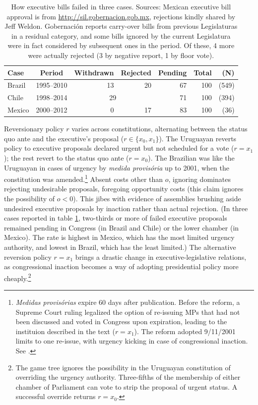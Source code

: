 \documentclass[letter,12pt]{article}
\newcommand{\mc}{\multicolumn}
\begin{document}
\begin{table}
\centering
\begin{tabular}{lcrrrrr}
Case   & Period     & Withdrawn & Rejected & Pending & Total & (N) \\ \hline
Brazil & 1995--2010 &  13       &   20     &   67    &  100  & (549) \\
Chile  & 1998--2014 & \mc{2}{c}{29}        &   71    &  100  & (394) \\
Mexico & 2000--2012 &   0       &   17     &   83    &  100  &  (36) \\
\end{tabular}
\caption{How executive bills failed in three cases. Sources: Mexican executive bill approval is from \protect\url{http://sil.gobernacion.gob.mx}, rejections kindly shared by Jeff Weldon. Gobernaci\'on reports carry-over bills from previous Legislaturas in a residual category, and some bills ignored by the current Legislatura were in fact considered by subsequent ones in the period. Of these, 4 more were actually rejected (3 by negative report, 1 by floor vote).}\label{t:exBillFail}
\end{table}

Reversionary policy $r$ varies across constitutions, alternating between the status quo ante and the executive's proposal ($r\in\{x_0,x_1\}$). The Uruguayan reverts policy to executive proposals declared urgent but not scheduled for a vote ($r=x_1$); the rest revert to the status quo ante ($r=x_0$). The Brazilian was like the Uruguayan in cases of urgency by \emph{medida provis\'oria} up to 2001, when the constitution was amended.\footnote{\emph{Medidas provis\'orias} expire 60 days after publication. Before the reform, a Supreme Court ruling legalized the option of re-issuing MPs that had not been discussed and voted in Congress upon expiration, leading to the instituion described in the text ($r=x_1$). The reform adopted 9/11/2001 limits to one re-issue, with urgency kicking in case of congressional inaction. See \citet{figueiredo.etal.1996}.} Absent costs other than $o$, ignoring dominates rejecting undesirable proposals, foregoing opportunity costs (this claim ignores the possibility of $o<0$). This jibes with evidence of assemblies brushing aside undesired executive proposals by inaction rather than actual rejection. (In three cases reported in table \ref{t:exBillFail}, two-thirds or more of failed executive proposals remained pending in Congress (in Brazil and Chile) or the lower chamber (in Mexico). The rate is highest in Mexico, which has the most limited urgency authority, and lowest in Brazil, which has the least limited.) The alternative reversion policy $r=x_1$ brings a drastic change in executive-legislative relations, as congressional inaction becomes a way of adopting presidential policy more cheaply.\footnote{The game tree ignores the possibility in the Uruguayan constitution of overriding the urgency authority. Three-fifths of the membership of either chamber of Parliament can vote to strip the proposal of urgent status. A successful override returns $r=x_0$.} 
\end{document}
